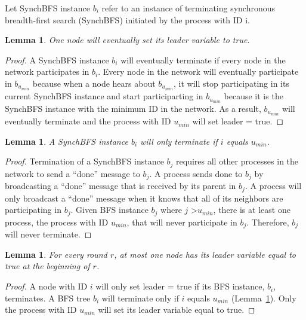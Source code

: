 \documentclass[english]{article}
\newtheorem{lemma}[theorem]{Lemma}
\begin{document}
\begin{definition}
Let SynchBFS instance $b_i$ refer to an instance of terminating synchronous breadth-first search (SynchBFS) initiated by the process with ID i.
\end{definition}

\begin{lemma}
\label{LELivenessStatic}
  One node will eventually set its leader variable to true.
\end{lemma}
\begin{proof}
A SynchBFS instance $b_i$ will eventually terminate if every node in the network participates in $b_i$. 
Every node in the network will eventually participate in $b_{u_{min}}$ because when a node hears about $b_{u_{min}}$, it will stop participating in its current SynchBFS instance and start participarting in $b_{u_{min}}$ because it is the SynchBFS instance with the minimum ID in the network. As a result, $b_{u_{min}}$ will eventually terminate and the process with ID $u_{min}$ will set leader = true.
\end{proof}

\begin{lemma}
\label{BFSTermination}
  A SynchBFS instance $b_i$ will only terminate if $i$ equals $u_{min}$.
\end{lemma}
\begin{proof}
Termination of a SynchBFS instance $b_j$ requires all other processes in the network to send a ``done'' message to $b_j$. A process sends done to $b_j$ by broadcasting a ``done'' message that is received by its parent in $b_j$. A process will only broadcast a ``done'' message when it knows that all of its neighbors are participating in $b_j$.
Given BFS instance $b_j$ where $j$ \textgreater $u_{min}$, there is at least one process, the process with ID $u_{min}$, that will never participate in $b_j$.
Therefore, $b_j$ will never terminate.
\end{proof}


\begin{lemma}
\label{LESafetyStatic}
For every round $r$, at most one node has its leader variable equal to true at the beginning of $r$.
\end{lemma}
\begin{proof}
A node with ID $i$ will only set leader = true if its BFS instance, $b_i$, terminates.
A BFS tree $b_i$ will terminate only if $i$ equals $u_{min}$ (Lemma~\ref{BFSTermination}).
Only the process with ID $u_{min}$ will set its leader variable equal to true. 
\end{proof}
\end{document}
